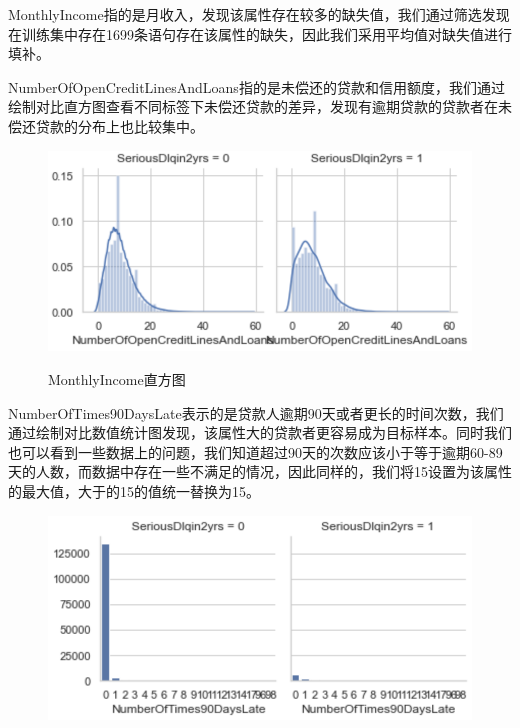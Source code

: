 \documentclass{zjureport}
\begin{document}
\begin{clause}
     \item MonthlyIncome指的是月收入，发现该属性存在较多的缺失值，我们通过筛选发现在训练集中存在1699条语句存在该属性的缺失，因此我们采用平均值对缺失值进行填补。
     
     \item NumberOfOpenCreditLinesAndLoans指的是未偿还的贷款和信用额度，我们通过绘制对比直方图查看不同标签下未偿还贷款的差异，发现有逾期贷款的贷款者在未偿还贷款的分布上也比较集中。
    \begin{figure}[H]
    \centering
    \includegraphics[scale=0.7]{figures/image8.png}\\
    \caption{MonthlyIncome直方图}
    \end{figure}
      \item NumberOfTimes90DaysLate表示的是贷款人逾期90天或者更长的时间次数，我们通过绘制对比数值统计图发现，该属性大的贷款者更容易成为目标样本。同时我们也可以看到一些数据上的问题，我们知道超过90天的次数应该小于等于逾期60-89天的人数，而数据中存在一些不满足的情况，因此同样的，我们将15设置为该属性的最大值，大于的15的值统一替换为15。
    \begin{figure}[H]
    \centering
    \includegraphics[scale=0.7]{figures/image9.png}\\

\end{figure}
\end{clause}
\end{document}
